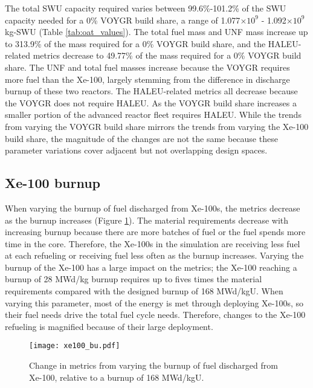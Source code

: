 The total \gls{SWU} capacity required varies between 99.6\%-101.2\% of the 
\gls{SWU} capacity needed for a 0\% VOYGR build share, a range of 1.077$\times 10^9$
- 1.092$\times 10^9$ kg-SWU (Table \ref{tab:oat_values}). The total fuel mass 
and \gls{UNF} mass increase 
up to 313.9\% of the mass required for a 0\% VOYGR build share, and the 
\gls{HALEU}-related metrics decrease to 49.77\% of the mass required 
for a 0\% VOYGR build share. The \gls{UNF} and total fuel masses increase 
because the VOYGR requires more fuel than the Xe-100, largely stemming from 
the difference in discharge burnup of these two reactors. The \gls{HALEU}-related 
metrics all decrease because the VOYGR does not require \gls{HALEU}. As the 
VOYGR build share increases a smaller portion of the advanced reactor fleet 
requires \gls{HALEU}. While the trends from varying the VOYGR build share 
mirrors the trends from varying the Xe-100 build share, the magnitude of the 
changes are not the same because these 
parameter variations cover adjacent but not overlapping design spaces. 

\subsection{Xe-100 burnup}
When varying the burnup of fuel discharged from Xe-100s, the metrics decrease 
as the burnup increases (Figure \ref{fig:xe100_bu_s7}). The material 
requirements decrease with increasing burnup because there are more 
batches of fuel or the fuel spends more time in the core.  
Therefore, the Xe-100s in the simulation are receiving 
less fuel at each refueling or receiving fuel less often as the burnup increases. 
Varying the burnup of the Xe-100 has a large impact on the metrics; the Xe-100 
reaching a burnup of 28 MWd/kg burnup requires up to fives times 
the material requirements compared with the designed burnup of 168 MWd/kgU.
When varying this parameter, most of the energy is met through deploying 
Xe-100s, so their fuel needs drive the total fuel cycle needs. 
Therefore, changes to the Xe-100 refueling is 
magnified because of their large deployment. 

\begin{figure}[h!]
    \centering
    \texttt{[image: xe100\_bu.pdf]}
    \caption{Change in metrics from varying the burnup of fuel 
    discharged from Xe-100, relative to a burnup of 168 MWd/kgU.}
    \label{fig:xe100_bu_s7}
\end{figure}

